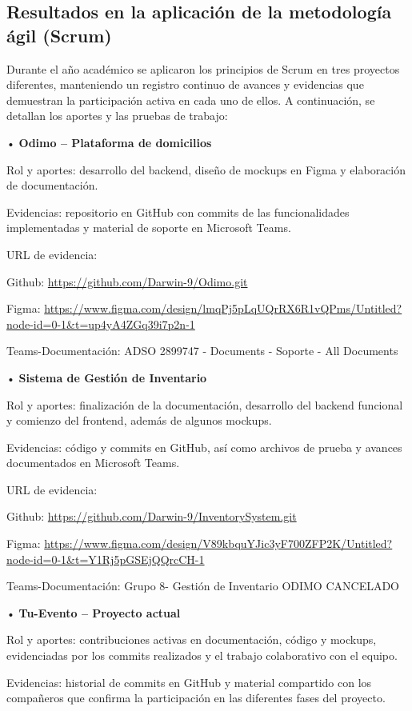 \subsection{Resultados en la aplicación de la metodología ágil (Scrum)}
Durante el año académico se aplicaron los principios de Scrum en tres proyectos diferentes, manteniendo un registro continuo de avances y evidencias que demuestran la participación activa en cada uno de ellos. A continuación, se detallan los aportes y las pruebas de trabajo:

• \textbf{Odimo – Plataforma de domicilios}

Rol y aportes: desarrollo del backend, diseño de mockups en Figma y elaboración de documentación.

Evidencias: repositorio en GitHub con commits de las funcionalidades implementadas y material de soporte en Microsoft Teams.

URL de evidencia:

Github: \url{https://github.com/Darwin-9/Odimo.git}

Figma: \url{https://www.figma.com/design/lmqPj5pLqUQrRX6R1vQPms/Untitled?node-id=0-1&t=up4yA4ZGq39i7p2n-1}

Teams-Documentación: ADSO 2899747 - Documents - Soporte - All Documents

• \textbf{Sistema de Gestión de Inventario}

Rol y aportes: finalización de la documentación, desarrollo del backend funcional y comienzo del frontend, además de algunos mockups.

Evidencias: código y commits en GitHub, así como archivos de prueba y avances documentados en Microsoft Teams.

URL de evidencia:

Github: \url{https://github.com/Darwin-9/InventorySystem.git}

Figma: \url{https://www.figma.com/design/V89kbquYJic3yF700ZFP2K/Untitled?node-id=0-1&t=Y1Rj5pGSEjQQrcCH-1}

Teams-Documentación: Grupo 8- Gestión de Inventario ODIMO CANCELADO

• \textbf{Tu-Evento – Proyecto actual}

Rol y aportes: contribuciones activas en documentación, código y mockups, evidenciadas por los commits realizados y el trabajo colaborativo con el equipo.

Evidencias: historial de commits en GitHub y material compartido con los compañeros que confirma la participación en las diferentes fases del proyecto.

